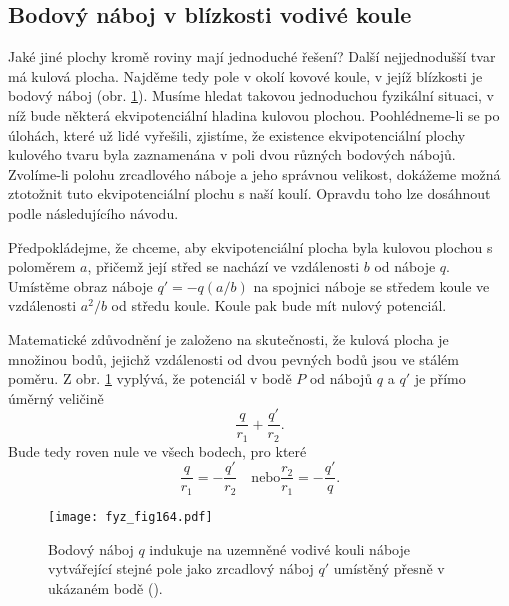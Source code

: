   \subsection{Bodový náboj v blízkosti vodivé koule}  %
    Jaké jiné plochy kromě roviny mají jednoduché řešení? Další nejjednodušší tvar má kulová 
    plocha. Najděme tedy pole v okolí kovové koule, v jejíž blízkosti je bodový náboj (obr. 
    \ref{fyz:fig164}). Musíme hledat takovou jednoduchou fyzikální situaci, v níž bude některá 
    ekvipotenciální hladina kulovou plochou. Poohlédneme-li se po úlohách, které už lidé vyřešili, 
    zjistíme, že existence ekvipotenciální plochy kulového tvaru byla zaznamenána v poli dvou 
    různých bodových nábojů. Zvolíme-li polohu zrcadlového náboje a jeho správnou velikost, 
    dokážeme možná ztotožnit tuto ekvipotenciální plochu s naší koulí. Opravdu toho lze dosáhnout 
    podle následujícího návodu.
    
    Předpokládejme, že chceme, aby ekvipotenciální plocha byla kulovou plochou s poloměrem \(a\), 
    přičemž její střed se nachází ve vzdálenosti \(b\) od náboje \(q\). Umístěme obraz náboje \(q' 
    = -q(a/b)\) na spojnici náboje se středem koule ve vzdálenosti \(a^2/b\) od středu koule. Koule 
    pak bude mít nulový potenciál.
    
    Matematické zdůvodnění je založeno na skutečnosti, že kulová plocha je množinou bodů, jejichž 
    vzdálenosti od dvou pevných bodů jsou ve stálém poměru. Z obr. \ref{fyz:fig164} vyplývá, že 
    potenciál v bodě \(P\) od nábojů \(q\) a \(q'\) je přímo úměrný veličině
    \begin{equation*}
      \dfrac{q}{r_1} + \dfrac{q'}{r_2}.
    \end{equation*}
    Bude tedy roven nule ve všech bodech, pro které
    \begin{equation*}
      \dfrac{q}{r_1} = -\dfrac{q'}{r_2} \quad\text{nebo} \dfrac{r_2}{r_1} = -\dfrac{q'}{q}.
    \end{equation*}
    
    \begin{figure}[ht!]  %
      \centering
      \texttt{[image: fyz\_fig164.pdf]}
      \caption{Bodový náboj \(q\) indukuje na uzemněné vodivé kouli náboje vytvářející stejné pole 
               jako zrcadlový náboj \(q'\) umístěný přesně v ukázaném bodě 
               (\cite[s.~113]{Feynman02}).}
      \label{fyz:fig164}
    \end{figure}
    
